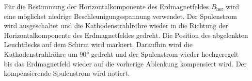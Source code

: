 Für die Bestimmung der Horizontalkomponente des Erdmagnetfeldes $B_{\mathrm{hor}}$ wird eine 
möglichst niedrige Beschleunigungsspannung verwendet. 
Der Spulenstrom wird ausgeschaltet und die Kathodenstrahlröhre wieder in die Richtung der 
Horizontalkomponente des Erdmagnetfeldes gedreht. Die Position des abgelenkten Leuchtflecks 
auf dem Schirm wird markiert. Daraufhin wird die Kathodenstrahlröhre um $90°$ gedreht und 
der Spulenstrom wieder hochgeregelt bis das Erdmagnetfeld wieder auf die vorherige Ablenkung
kompensiert wird. Der kompensierende Spulenstrom wird notiert.
